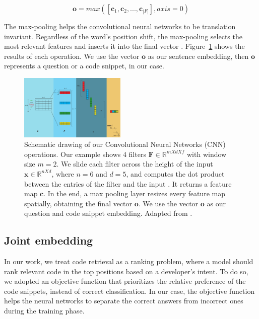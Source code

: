 \documentclass[sigconf]{acmart}
\begin{document}
\begin{equation}
    \bm{o} = max\left(\left[\bm{c}_{1}, \bm{c}_{2}, . . ., \bm{c}_{|F|}\right], axis = 0\right)
\end{equation}

The max-pooling helps the convolutional neural networks to be translation invariant. Regardless of the word's position shift, the max-pooling selects the most relevant features and inserts it into the final vector \citep{tom-young:trends-deep-learning-nlp}. Figure~\ref{fig:cnn-steps-word-embedding} shows the results of each operation. We use the vector $\bm{o}$ as our sentence embedding, then $\bm{o}$ represents a question or a code snippet, in our case. 

\begin{figure}[H]
    \centering
    \includegraphics[width=0.45\textwidth]{figuras/cnn-steps-word-embedding-article.pdf}
    \caption{Schematic drawing of our Convolutional Neural Networks (CNN) operations. Our example shows 4 filters $\bm{F} \in \mathbb{R}^{m X d X f}$ with window size $m = 2$. We slide each filter across the height of the input $\bm{x} \in \mathbb{R}^{n X d}$, where $n = 6$ and $d = 5$, and computes the dot product between the entries of the filter and the input \cite{karpathy-course-cnn-2016}. It returns a feature map $\bm{c}$. In the end, a max pooling layer resizes every feature map spatially, obtaining the final vector $\bm{o}$. We use the vector $\bm{o}$ as our question and code snippet embedding. Adapted from \cite{zhang-guide-convolutional-cnn-embedding-ilustration:2015}.}
    \label{fig:cnn-steps-word-embedding}
\end{figure}

\subsection{Joint embedding}
\label{sec:joint-embedding}

In our work, we treat code retrieval as a ranking problem, where a model should rank relevant code in the top positions based on a developer's intent. To do so, we adopted an objective function that prioritizes the relative preference of the code snippets, instead of correct classification. In our case, the objective function helps the neural networks to separate the correct answers from incorrect ones during the training phase.
\end{document}
